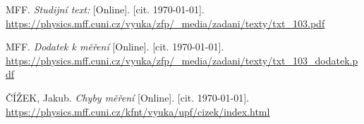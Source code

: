 
\begin{thebibliography}{9}
 MFF. \emph{Studijní text:} [Online]. [cit. \today]. \newline \url{https://physics.mff.cuni.cz/vyuka/zfp/_media/zadani/texty/txt_103.pdf}

 MFF. \emph{Dodatek k měření} [Online]. [cit. \today]. \newline \url{https://physics.mff.cuni.cz/vyuka/zfp/_media/zadani/texty/txt_103_dodatek.pdf}

 ČÍŽEK, Jakub. \emph{Chyby měření} [Online]. [cit. \today]. \newline \url{https://physics.mff.cuni.cz/kfnt/vyuka/upf/cizek/index.html}

\end{thebibliography}
